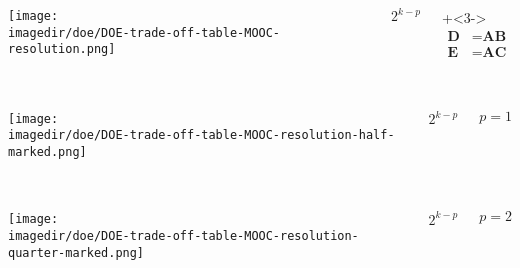 \documentclass[handout,11pt,aspectratio=169,mathserif]{beamer}
\begin{document}
\begin{frame}\frametitle{}
	\begin{columns}[T]
			\texttt{[image: \\imagedir/doe/DOE-trade-off-table-MOOC-resolution.png]}
		
			
			
				\vspace{2cm}
				{\Huge
					$2^{k-p}$
				} 
			 
				\vspace{2cm}
				\onslide+<3->{ 
					\begin{align*}
						\textbf{D} &= \textbf{AB}\\
						\textbf{E}\, &= \textbf{AC} 
					\end{align*}
				}
	\end{columns}
	
\end{frame}

\begin{frame}\frametitle{}
	\begin{columns}[T]
			\texttt{[image: \\imagedir/doe/DOE-trade-off-table-MOOC-resolution-half-marked.png]}
		
			
			
				\vspace{2cm}
				{\Huge
					$2^{k-p}$\\
					
					\vspace{1cm}
					
				} $p=1$
			 
				
	\end{columns}
	
\end{frame}

\begin{frame}\frametitle{}
	\begin{columns}[T]
			\texttt{[image: \\imagedir/doe/DOE-trade-off-table-MOOC-resolution-quarter-marked.png]}
		
			
			
				\vspace{2cm}
				{\Huge
					$2^{k-p}$\\
					
					\vspace{1cm}
					
				} $p=2$
			 
				
	\end{columns}
	
\end{frame}
\end{document}
